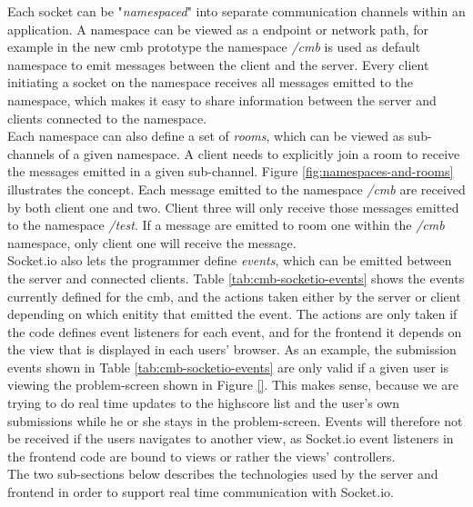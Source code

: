 Each socket can be "\textit{namespaced}" into separate communication channels within an application. A namespace can be viewed as a endpoint or network path, for example in the new \gls{cmb} prototype the namespace \textit{/cmb} is used as default namespace to emit messages between the client and the server. Every client initiating a socket on the namespace receives all messages emitted to the namespace, which makes it easy to share information between the server and clients connected to the namespace. \\

Each namespace can also define a set of \textit{rooms}, which can be viewed as sub-channels of a given namespace. A client needs to explicitly join a room to receive the messages emitted in a given sub-channel. Figure \ref{fig:namespaces-and-rooms} illustrates the concept. Each message emitted to the namespace \textit{/cmb} are received by both client one and two. Client three will only receive those messages emitted to the namespace \textit{/test}. If a message are emitted to room one within the \textit{/cmb} namespace, only client one will receive the message. \\

Socket.io also lets the programmer define \textit{events}, which can be emitted between the server and connected clients. Table \ref{tab:cmb-socketio-events} shows the events currently defined for the \gls{cmb}, and the actions taken either by the server or client depending on which enitity that emitted the event. The actions are only taken if the code defines event listeners for each event, and for the frontend it depends on the view that is displayed in each users' browser. As an example, the submission events shown in Table \ref{tab:cmb-socketio-events} are only valid if a given user is viewing the problem-screen shown in Figure \ref{}. This makes sense, because we are trying to do real time updates to the highscore list and the user's own submissions while he or she stays in the problem-screen. Events will therefore not be received if the users navigates to another view, as Socket.io event listeners in the frontend code are bound to views or rather the views' controllers.  \\

The two sub-sections below describes the technologies used by the server and frontend in order to support real time communication with Socket.io.

